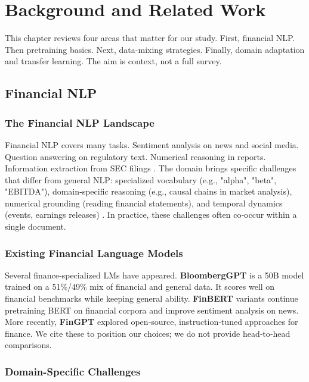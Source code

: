 \chapter{Background and Related Work}

This chapter reviews four areas that matter for our study. First, financial NLP. Then pretraining basics. Next, data-mixing strategies. Finally, domain adaptation and transfer learning. The aim is context, not a full survey.

\section{Financial NLP}

\subsection{The Financial NLP Landscape}

Financial NLP covers many tasks. Sentiment analysis on news and social media. Question answering on regulatory text. Numerical reasoning in reports. Information extraction from SEC filings \parencite{araci2019finbert, chen2021finqa}. The domain brings specific challenges that differ from general NLP: specialized vocabulary (e.g., "alpha", "beta", "EBITDA"), domain‑specific reasoning (e.g., causal chains in market analysis), numerical grounding (reading financial statements), and temporal dynamics (events, earnings releases) \parencite{wu2023bloomberggpt, araci2019finbert}. In practice, these challenges often co‑occur within a single document.

\subsection{Existing Financial Language Models}

Several finance‑specialized LMs have appeared. \textbf{BloombergGPT} \parencite{wu2023bloomberggpt} is a 50B model trained on a 51\%/49\% mix of financial and general data. It scores well on financial benchmarks while keeping general ability. \textbf{FinBERT} variants \parencite{araci2019finbert, yang2020finbert} continue pretraining BERT on financial corpora and improve sentiment analysis on news. More recently, \textbf{FinGPT} \parencite{yang2023fingpt} explored open‑source, instruction‑tuned approaches for finance. We cite these to position our choices; we do not provide head‑to‑head comparisons.

\subsection{Domain-Specific Challenges}

